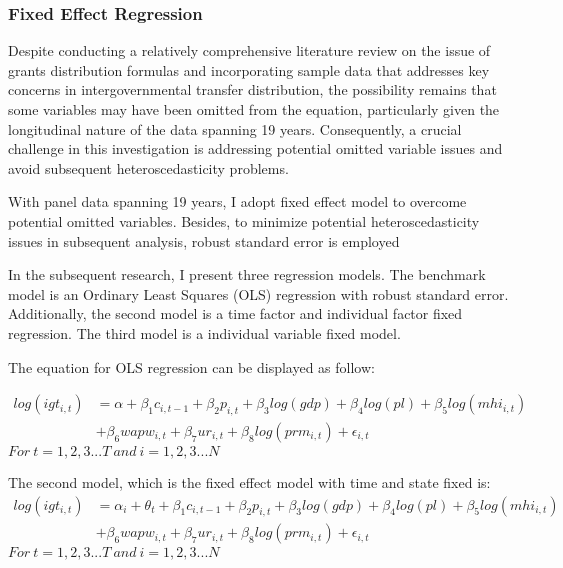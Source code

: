 \subsubsection{Fixed Effect Regression}
Despite conducting a relatively comprehensive literature review on the issue of grants distribution formulas and incorporating sample data that addresses key concerns in intergovernmental transfer distribution, the possibility remains that some variables may have been omitted from the equation, particularly given the longitudinal nature of the data spanning 19 years. Consequently, a crucial challenge in this investigation is addressing potential omitted variable issues and avoid subsequent heteroscedasticity problems.

With panel data spanning 19 years, I adopt fixed effect model to overcome potential omitted variables. Besides, to minimize potential heteroscedasticity issues in subsequent analysis, robust standard error is employed

In the subsequent research, I present three regression models. The benchmark model is an Ordinary Least Squares (OLS) regression with robust standard error. Additionally, the second model is a time factor and individual factor fixed regression. The third model is a individual variable fixed model.


The equation for OLS regression can be displayed as follow:

\begin{equation}
    \begin{split}
        log(igt_{i,t}) & = \alpha + \beta_1 c_{i,t-1} + \beta_2 p_{i,t} + \beta_3 log(gdp) + \beta_4 log(pl) + \beta_5 log(mhi_{i,t}) \\
        & + \beta_6 wapw_{i,t} + \beta_7 ur_{i,t} +\beta_8 log(prm_{i,t}) + \epsilon_{i,t}
    \end{split}
\end{equation}
$For\ t = 1, 2, 3...T\ and\ i = 1, 2, 3...N $

The second model, which is the fixed effect model with time and state fixed is:
\begin{equation}
    \begin{split}
        log(igt_{i,t}) & = \alpha_i + \theta_t + \beta_1 c_{i,t-1} + \beta_2 p_{i,t} + \beta_3 log(gdp) + \beta_4 log(pl) + \beta_5 log(mhi_{i,t}) \\
        &+ \beta_6 wapw_{i,t} + \beta_7 ur_{i,t} +\beta_8 log(prm_{i,t}) + \epsilon_{i,t}
    \end{split}
\end{equation}
$For\ t = 1, 2, 3...T\ and\ i = 1, 2, 3...N $

